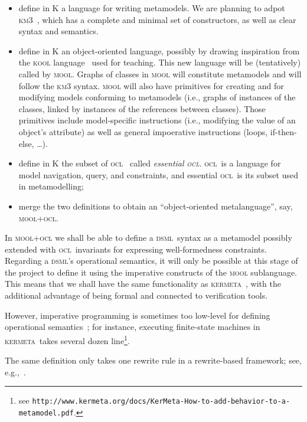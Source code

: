 \documentclass[a4paper,11pt,twoside]{article}
\newcommand{\dsml}{\textsc{dsml}}
\newcommand{\kmt}{\textsc{kermeta}}
\newcommand{\ocl}{\textsc{ocl}}
\begin{document}
\begin{itemize}
\item define in K a language for writing metamodels. We are planning to adpot \textsc{km3}~\cite{DBLP:conf/fmoods/JouaultB06}, which has a complete and minimal set of constructors,
 as well as  clear syntax and semantics.
\item define in K an object-oriented language, possibly by drawing inspiration from the
  \textsc{kool} language~\cite{hills-rosu-2007-rta} used for teaching.
This new language will be (tentatively)  called by \textsc{mool}. Graphs of classes in  \textsc{mool} will constitute metamodels and will follow the 
\textsc{km3} syntax.
\textsc{mool} will also have primitives for creating and for modifying models conforming to metamodels (i.e., graphs of instances of the classes, linked by instances of the references
between classes). Those primitives include model-specific instructions (i.e., modifying the value of an object's attribute) as well as general impoerative instructions
(loops, if-then-else, \ldots).


\item define in K the subset of  \ocl~\cite{ocl} called \emph{essential \ocl}. \ocl\ is a language for model navigation, 
 query, and constraints, and essential \ocl\  is its  subset used in metamodelling;
\item merge  the two definitions to obtain an ``object-oriented metalanguage'', say, \textsc{mool+ocl}.
\end{itemize}

In \textsc{mool+ocl}  we shall be able to define a \dsml\ syntax as a metamodel possibly extended with \ocl\ invariants for expressing well-formedness constraints. Regarding a  \dsml's operational semantics, it will only  be possible
at this stage of the project to define it using the imperative constructs of the \textsc{mool} sublanguage. This means that we shall have the same functionality as \kmt~\cite{DBLP:conf/uml/MullerFJ05}, with the additional advantage of being formal and connected to verification tools. 


 However,  imperative programming is sometimes too low-level for defining operational semantics~; for instance, executing
finite-state machines in \kmt\ takes several dozen line\footnote{see \texttt{http://www.kermeta.org/docs/KerMeta-How-to-add-behavior-to-a-metamodel.pdf}.}.

The same definition only takes one  rewrite  rule in a rewrite-based framework; see, e.g.,~\cite{r10b}. 
\end{document}
